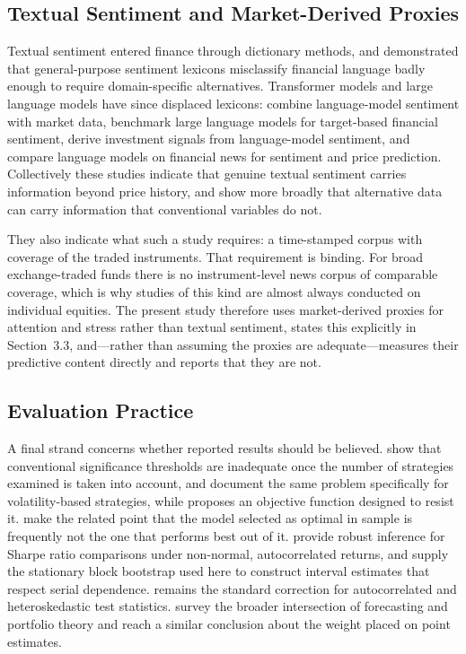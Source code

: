 \subsection{Textual Sentiment and Market-Derived Proxies}

Textual sentiment entered finance through dictionary methods, and
\citet{loughran11} demonstrated that general-purpose sentiment lexicons misclassify
financial language badly enough to require domain-specific alternatives. Transformer
models and large language models have since displaced lexicons: \citet{officioso26}
combine language-model sentiment with market data, \citet{muhammad26} benchmark large
language models for target-based financial sentiment, \citet{mun25} derive investment
signals from language-model sentiment, and \citet{chuang25} compare language models on
financial news for sentiment and price prediction. Collectively these studies indicate
that genuine textual sentiment carries information beyond price history, and
\citet{mazzotta25} show more broadly that alternative data can carry information that
conventional variables do not.

They also indicate what such a study requires: a time-stamped corpus with coverage of
the traded instruments. That requirement is binding. For broad exchange-traded funds
there is no instrument-level news corpus of comparable coverage, which is why studies
of this kind are almost always conducted on individual equities. The present study
therefore uses market-derived proxies for attention and stress rather than textual
sentiment, states this explicitly in Section~3.3, and---rather than assuming the proxies
are adequate---measures their predictive content directly and reports that they are
not.

\subsection{Evaluation Practice}

A final strand concerns whether reported results should be believed.
\citet{harvey15} show that conventional significance thresholds are inadequate once the
number of strategies examined is taken into account, and \citet{valls26} document the
same problem specifically for volatility-based strategies, while \citet{sheppert26}
proposes an objective function designed to resist it. \citet{zhangz25} make the related
point that the model selected as optimal in sample is frequently not the one that
performs best out of it. \citet{ledoit08} provide
robust inference for Sharpe ratio comparisons under non-normal, autocorrelated returns,
and \citet{politis94} supply the stationary block bootstrap used here to construct
interval estimates that respect serial dependence. \citet{newey87} remains the standard
correction for autocorrelated and heteroskedastic test statistics.
\citet{raimundo26} survey the broader intersection of forecasting and portfolio theory
and reach a similar conclusion about the weight placed on point estimates.


